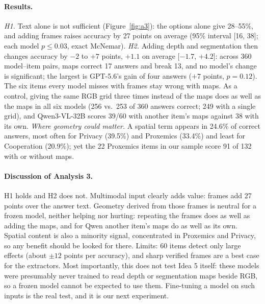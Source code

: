 \paragraph{Results.} \emph{H1.} Text alone is not sufficient (Figure~\ref{fig:a3}): the options alone give 28--55\%, and adding frames raises accuracy by 27 points on average (95\% interval [16, 38]; each model $p\le0.03$, exact McNemar). \emph{H2.} Adding depth and segmentation then changes accuracy by $-2$ to $+7$ points, $+1.1$ on average [$-1.7$, $+4.2$]: across 360 model--item pairs, maps correct 17 answers and break 13, and no model's change is significant; the largest is GPT-5.6's gain of four answers ($+7$ points, $p=0.12$). The six items every model misses with frames stay wrong with maps. As a control, giving the same RGB grid three times instead of the maps does as well as the maps in all six models (256 vs.\ 253 of 360 answers correct; 249 with a single grid), and Qwen3-VL-32B scores 39/60 with another item's maps against 38 with its own. \emph{Where geometry could matter.} A spatial term appears in 24.6\% of correct answers, most often for Privacy (39.5\%) and Proxemics (33.4\%) and least for Cooperation (20.9\%); yet the 22 Proxemics items in our sample score 91 of 132 with or without maps.

\paragraph{Discussion of Analysis 3.} H1 holds and H2 does not. Multimodal input clearly adds value: frames add 27 points over the answer text. Geometry derived from those frames is neutral for a frozen model, neither helping nor hurting: repeating the frames does as well as adding the maps, and for Qwen another item's maps do as well as its own. Spatial content is also a minority signal, concentrated in Proxemics and Privacy, so any benefit should be looked for there. Limits: 60 items detect only large effects (about $\pm12$ points per accuracy), and sharp verified frames are a best case for the extractors. Most importantly, this does not test Idea 5 itself: these models were presumably never trained to read depth or segmentation maps beside RGB, so a frozen model cannot be expected to use them. Fine-tuning a model on such inputs is the real test, and it is our next experiment.
